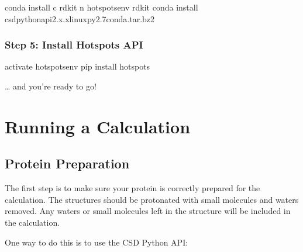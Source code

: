 \documentclass[letterpaper,10pt,english]{sphinxmanual}
\begin{document}
\begin{sphinxVerbatim}[commandchars=\\\{\}]
conda install \PYGZhy{}c rdkit \PYGZhy{}n hotspots\PYGZus{}env rdkit
conda install csd\PYGZhy{}python\PYGZhy{}api\PYGZhy{}2.x.x\PYGZhy{}linux\PYGZhy{}py2.7\PYGZhy{}conda.tar.bz2
\end{sphinxVerbatim}


\subsubsection{Step 5: Install Hotspots API}
\label{\detokenize{tutorial:step-5-install-hotspots-api}}
\begin{sphinxVerbatim}[commandchars=\\\{\}]
 activate hotspots\PYGZus{}env
pip install hotspots
\end{sphinxVerbatim}

… and you’re ready to go!


\section{Running a Calculation}
\label{\detokenize{tutorial:running-a-calculation}}

\subsection{Protein Preparation}
\label{\detokenize{tutorial:protein-preparation}}
The first step is to make sure your protein is correctly prepared for the calculation. The structures should be
protonated with small molecules and waters removed. Any waters or small molecules left in the structure will be included
in the calculation.

One way to do this is to use the CSD Python API:

\begin{sphinxVerbatim}[commandchars=\\\{\}]
   

  
   
\end{sphinxVerbatim}
\end{document}
